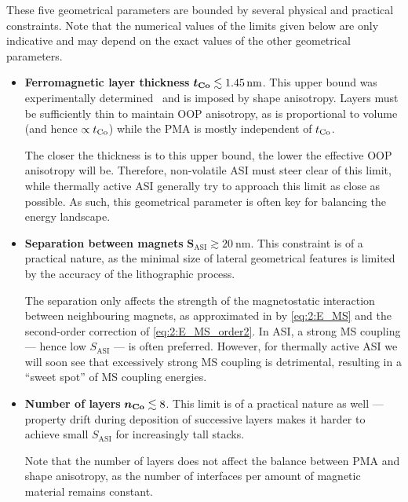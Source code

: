 These five geometrical parameters are bounded by several physical and practical constraints.
Note that the numerical values of the limits given below are only indicative and may depend on the exact values of the other geometrical parameters.
\begin{itemize}
	\item \textbf{Ferromagnetic layer thickness} $\boldsymbol{t_{\ce{Co}}} \lesssim \SI{1.45}{\nano\metre}$. \newline
	This upper bound was experimentally determined~\cite{KUR-24} and is imposed by shape anisotropy.
	Layers must be sufficiently thin to maintain OOP anisotropy, as  is proportional to volume (and hence $\propto t_{\ce{Co}}$) while the PMA is mostly independent of $t_{\ce{Co}}$. \par %
	The closer the thickness is to this upper bound, the lower the effective OOP anisotropy will be.
	Therefore, non-volatile ASI must steer clear of this limit, while thermally active ASI generally try to approach this limit as close as possible.
	As such, this geometrical parameter is often key for balancing the energy landscape.
	\item \textbf{Separation between magnets} $\boldsymbol{S_\mathrm{ASI}} \gtrsim \SI{20}{\nano\metre}$. \newline
	This constraint is of a practical nature, as the minimal size of lateral geometrical features is limited by the accuracy of the lithographic process. \par
	The separation only affects the strength of the magnetostatic interaction between neighbouring magnets, as approximated in \hotspice by \cref{eq:2:E_MS} and the second-order correction of \cref{eq:2:E_MS_order2}.
	In ASI, a strong MS coupling --- hence low $S_\mathrm{ASI}$ --- is often preferred.
	However, for thermally active ASI we will soon see that excessively strong MS coupling is detrimental, resulting in a ``sweet spot'' of MS coupling energies.
	\item \textbf{Number of layers} $\boldsymbol{n_{\ce{Co}}} \lesssim 8$. \newline
	This limit is of a practical nature as well --- property drift during deposition of successive layers makes it harder to achieve small $S_\mathrm{ASI}$ for increasingly tall stacks. \par
	Note that the number of layers does not affect the balance between PMA and shape anisotropy, as the number of interfaces per amount of magnetic material remains constant.

\end{itemize}
